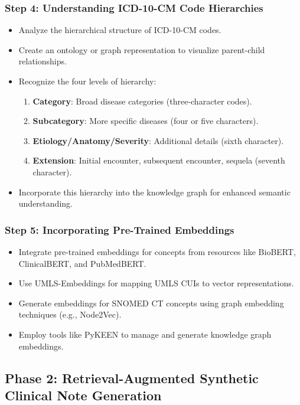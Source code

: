 \documentclass[12pt, a4paper]{article}
\begin{document}
\subsubsection{Step 4: Understanding ICD-10-CM Code Hierarchies}

\begin{itemize}
    \item Analyze the hierarchical structure of ICD-10-CM codes.
    \item Create an ontology or graph representation to visualize parent-child relationships.
    \item Recognize the four levels of hierarchy:
    \begin{enumerate}
        \item \textbf{Category}: Broad disease categories (three-character codes).
        \item \textbf{Subcategory}: More specific diseases (four or five characters).
        \item \textbf{Etiology/Anatomy/Severity}: Additional details (sixth character).
        \item \textbf{Extension}: Initial encounter, subsequent encounter, sequela (seventh character).
    \end{enumerate}
    \item Incorporate this hierarchy into the knowledge graph for enhanced semantic understanding.
\end{itemize}

\subsubsection{Step 5: Incorporating Pre-Trained Embeddings}

\begin{itemize}
    \item Integrate pre-trained embeddings for concepts from resources like BioBERT, ClinicalBERT, and PubMedBERT.
    \item Use UMLS-Embeddings for mapping UMLS CUIs to vector representations.
    \item Generate embeddings for SNOMED CT concepts using graph embedding techniques (e.g., Node2Vec).
    \item Employ tools like PyKEEN to manage and generate knowledge graph embeddings.
\end{itemize}

\subsection{Phase 2: Retrieval-Augmented Synthetic Clinical Note Generation}
\end{document}
